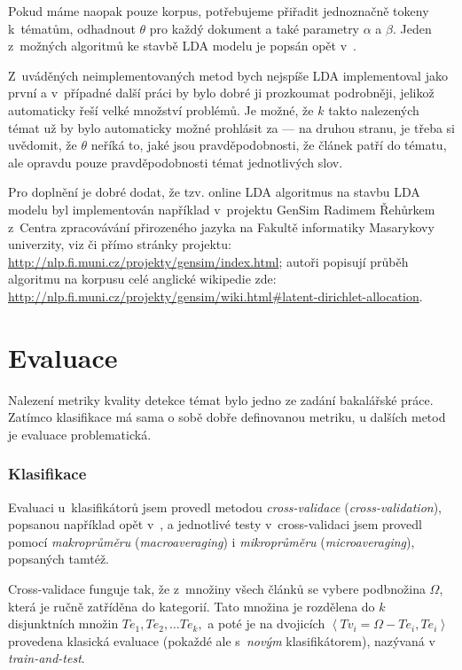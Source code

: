 \documentclass[12pt,a4paper]{report}
\begin{document}
Pokud máme naopak pouze korpus, potřebujeme přiřadit jednoznačně tokeny k~tématům, odhadnout $\theta$ pro každý dokument a také parametry $\alpha$ a $\beta$. Jeden z~možných algoritmů ke stavbě LDA modelu je popsán opět v~\cite{lda}.

Z~uváděných neimplementovaných metod bych nejspíše LDA implementoval jako první a v~případné další práci by bylo dobré ji prozkoumat podrobněji, jelikož automaticky řeší velké množství problémů. Je možné, že $k$ takto nalezených témat už by bylo automaticky možné prohlásit za  --- na druhou stranu, je třeba si uvědomit, že $\theta$ neříká to, jaké jsou pravděpodobnosti, že článek patří do tématu, ale opravdu pouze pravděpodobnosti témat jednotlivých slov.

Pro doplnění je dobré dodat, že tzv. online LDA algoritmus na stavbu LDA modelu byl implementován například v~projektu GenSim Radimem Řehůrkem z~Centra zpracovávání přirozeného jazyka na Fakultě informatiky Masarykovy univerzity, viz \cite{rehurek} či přímo stránky projektu: \url{http://nlp.fi.muni.cz/projekty/gensim/index.html}; autoři popisují průběh algoritmu na korpusu celé anglické wikipedie zde: \url{http://nlp.fi.muni.cz/projekty/gensim/wiki.html\#latent-dirichlet-allocation}.

\section{Evaluace}
\label{sec:evaluace}
Nalezení metriky kvality detekce témat bylo jedno ze zadání bakalářské práce. Zatímco klasifikace má sama o sobě dobře definovanou metriku, u dalších metod je evaluace problematická.

\subsubsection{Klasifikace}

Evaluaci u~klasifikátorů jsem provedl metodou \emph{cross-validace} (\emph{cross-va\-li\-da\-tion}), popsanou například opět v~\cite{machine_intro}, a jednotlivé testy v~cross-validaci jsem provedl pomocí \emph{makroprůměru} (\emph{macroaveraging}) i \emph{mikroprůměru} (\emph{microaveraging}), popsaných tamtéž.

Cross-validace funguje tak, že z~množiny všech článků se vybere podbnožina $\Omega$, která je ručně zatříděna do kategorií. Tato množina je rozdělena do $k$ disjunktních množin $Te_1, Te_2, \ldots Te_k,$ a poté je na dvojicích $\left<Tv_i=\Omega-Te_{i}, Te_{i}\right>$ provedena klasická evaluace (pokaždé ale s~\emph{novým} klasifikátorem), nazývaná v~\cite{machine_intro} \emph{train-and-test}.
\end{document}
